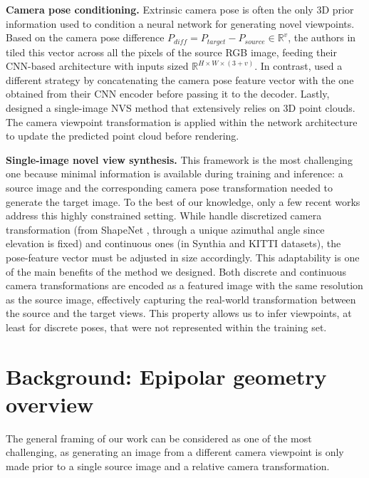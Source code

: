 \noindent\textbf{Camera pose conditioning.} Extrinsic camera pose is often the only 3D prior information used to condition a neural network for generating novel viewpoints. Based on the camera pose difference $P_{diff}=P_{target}-P_{source}\in \mathbb{R}^{v}$, the authors in \citep{sun2018multiview} tiled this vector across all the pixels of the source RGB image, feeding their \ac{CNN}-based architecture with inputs sized $\mathbb{R}^{H\times W\times (3+v)}$. In contrast, \citep{kim2020novel} used a different strategy by concatenating the camera pose feature vector with the one obtained from their \ac{CNN} encoder before passing it to the decoder. 
Lastly, \citep{wiles2020synsin} designed a single-image \ac{NVS} method that extensively relies on 3D point clouds. The camera viewpoint transformation is applied within the network architecture to update the predicted point cloud before rendering. \newline

\noindent\textbf{Single-image novel view synthesis.} This framework is the most challenging one because minimal information is available during training and inference: a source image and the corresponding camera pose transformation needed to generate the target image. To the best of our knowledge, only a few recent works \citep{sun2018multiview,kim2020novel,yu2021pixelnerf} address this highly constrained setting. While \citep{sun2018multiview, kim2020novel} handle discretized camera transformation (from ShapeNet \citep{chang2015shapenet}, through a unique azimuthal angle since elevation is fixed) and continuous ones (in Synthia \citep{ros2016synthia} and KITTI \citep{geiger2012we} datasets), the pose-feature vector must be adjusted in size accordingly. This adaptability is one of the main benefits of the method we designed. Both discrete and continuous camera transformations are encoded as a featured image with the same resolution as the source image, effectively capturing the real-world transformation between the source and the target views. This property allows us to infer viewpoints, at least for discrete poses, that were not represented within the training set. \newline

\section{Background: Epipolar geometry overview}

The general framing of our work can be considered as one of the most challenging, as generating an  image from a different camera viewpoint is only made prior to a single source image and a relative camera transformation. 

